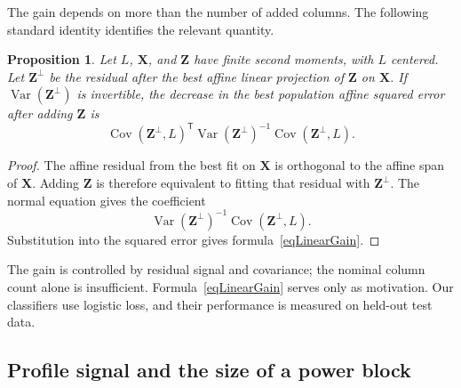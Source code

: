 \documentclass[12pt,reqno]{amsart}
\numberwithin{equation}{section}
\theoremstyle{plain}
\newtheorem{proposition}[theorem]{Proposition}
\theoremstyle{definition}
\theoremstyle{remark}
\begin{document}
The gain depends on more than the number of added columns.
The following standard identity identifies the relevant quantity.

\begin{proposition}
\label{propLinearIncrement}
Let $L$, $\mathbf X$, and $\mathbf Z$ have finite second moments, with $L$ centered.  Let $\mathbf Z^\perp$ be the residual after the best affine linear projection of $\mathbf Z$ on $\mathbf X$.
If $\operatorname{Var}(\mathbf Z^\perp)$ is invertible, the decrease in the best population affine squared error after adding $\mathbf Z$ is
\begin{equation}
\label{eqLinearGain}
\operatorname{Cov}(\mathbf Z^\perp,L)^{\mathsf T}
\operatorname{Var}(\mathbf Z^\perp)^{-1}
\operatorname{Cov}(\mathbf Z^\perp,L).
\end{equation}
\end{proposition}

\begin{proof}
The affine residual from the best fit on $\mathbf X$ is orthogonal to the affine span of $\mathbf X$.
Adding $\mathbf Z$ is therefore equivalent to fitting that residual with $\mathbf Z^\perp$.
The normal equation gives the coefficient
\begin{equation*}
\operatorname{Var}(\mathbf Z^\perp)^{-1}
\operatorname{Cov}(\mathbf Z^\perp,L).
\end{equation*}
Substitution into the squared error gives formula~\eqref{eqLinearGain}.
\end{proof}

The gain is controlled by residual signal and covariance; the nominal column count alone is insufficient.  Formula~\eqref{eqLinearGain} serves only as motivation.
Our classifiers use logistic loss, and their performance is measured on held-out test data.

\subsection{Profile signal and the size of a power block}
\end{document}
